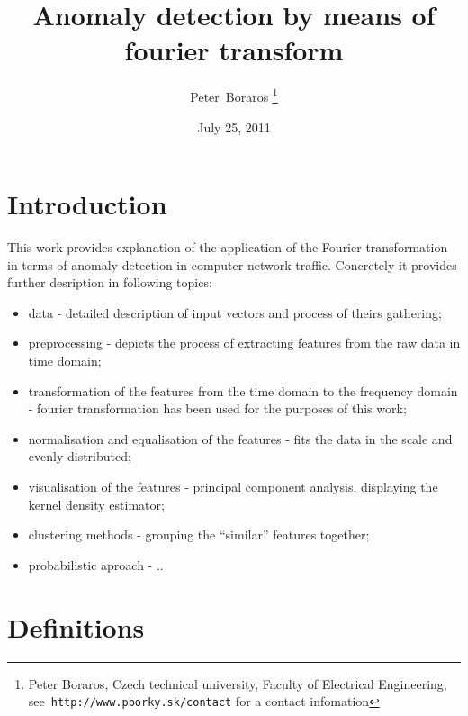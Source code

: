 \documentclass[a4paper]{IEEEtran}
\begin{document}
\title{Anomaly detection by means of fourier transform}
\date{July 25, 2011}
\author{Peter~Boraros %
\thanks{{Peter Boraros}, Czech technical university, Faculty of Electrical Engineering,
see~\texttt{http://www.pborky.sk/contact} for a contact infomation}}%



\maketitle
\IEEEdisplaynotcompsoctitleabstractindextext
\IEEEpeerreviewmaketitle

\section{Introduction}
This work provides explanation of the application of the Fourier transformation in terms of anomaly detection in computer network traffic.
Concretely it provides further desription in following topics:
\begin{itemize}
	\item data - detailed description of input vectors and process of theirs gathering;
	\item preprocessing - depicts the process of extracting features from the raw data in time domain;
	\item transformation of the features from the time domain to the frequency domain - fourier transformation has been used for the purposes of this work;
	\item normalisation and equalisation of the features - fits the data in the scale and evenly distributed;
	\item visualisation of the features - principal component analysis, displaying the kernel density estimator;
	\item clustering methods - grouping the ``similar'' features together;
	\item probabilistic aproach - ..
\end{itemize}

\section{Definitions}
\end{document}
